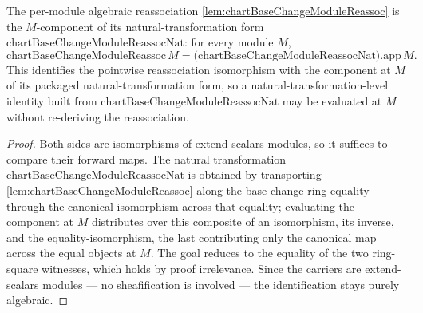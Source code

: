 \begin{lemma}
  \label{lem:chartBaseChangeModuleReassoc_eq_natApp}
  The per-module algebraic reassociation \cref{lem:chartBaseChangeModuleReassoc} is the \(M\)-component
  of its natural-transformation form \(\mathrm{chartBaseChangeModuleReassocNat}\): for every module
  \(M\),
  \[
    \mathrm{chartBaseChangeModuleReassoc}\,M
      = \bigl(\mathrm{chartBaseChangeModuleReassocNat}\bigr).\mathrm{app}\,M .
  \]
  This identifies the pointwise reassociation isomorphism with the component at \(M\) of its packaged
  natural-transformation form, so a natural-transformation-level identity built from
  \(\mathrm{chartBaseChangeModuleReassocNat}\) may be evaluated at \(M\) without re-deriving the
  reassociation.
  \begin{proof}
    Both sides are isomorphisms of extend-scalars modules, so it suffices to compare their forward
    maps. The natural transformation \(\mathrm{chartBaseChangeModuleReassocNat}\) is obtained by
    transporting \cref{lem:chartBaseChangeModuleReassoc} along the base-change ring equality through
    the canonical isomorphism across that equality; evaluating the component at \(M\) distributes over
    this composite of an isomorphism, its inverse, and the equality-isomorphism, the last contributing
    only the canonical map across the equal objects at \(M\). The goal reduces to the equality of the
    two ring-square witnesses, which holds by proof irrelevance. Since the carriers are extend-scalars
    modules — no sheafification is involved — the identification stays purely algebraic.
  \end{proof}
\end{lemma}

